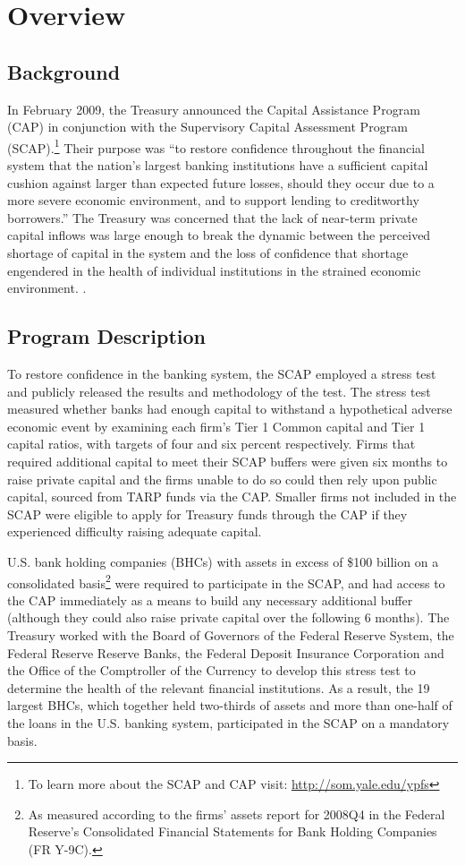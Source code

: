 \documentclass[justified, nobib]{tufte-handout2}
\begin{document}
\section{Overview}

\subsection{Background}

In February 2009, the Treasury announced the Capital Assistance Program
(CAP) in conjunction with the Supervisory Capital Assessment Program
(SCAP).\footnote{To learn more about the SCAP and CAP visit: \url{http://som.yale.edu/ypfs}} Their purpose was ``to restore confidence throughout the
financial system that the nation's largest banking institutions have a
sufficient capital cushion against larger than expected future losses,
should they occur due to a more severe economic environment, and to
support lending to creditworthy borrowers.'' The Treasury was concerned that the lack of near-term private capital inflows was large enough to
break the dynamic between the perceived shortage of capital in the
system and the loss of confidence that shortage engendered in the health
of individual institutions in the strained economic environment.
\citep{Term}.

\subsection{Program Description}

To restore confidence in the banking system, the SCAP employed a stress test and publicly
released the results and methodology of the test. The stress test measured whether banks had enough capital to withstand a hypothetical adverse economic event by examining each firm's Tier 1 Common capital and Tier 1 capital ratios, with targets of four and six percent respectively. Firms that required
additional capital to meet their SCAP buffers were given six months to
raise private capital and the firms unable to do so could then rely upon
public capital, sourced from TARP funds via the CAP. Smaller firms not
included in the SCAP were eligible to apply for Treasury funds through
the CAP if they experienced difficulty raising adequate capital.

U.S. bank holding companies (BHCs) with assets in excess of \$100
billion on a consolidated basis\footnote{As measured according to the
  firms' assets report for 2008Q4 in the Federal Reserve's Consolidated
  Financial Statements for Bank Holding Companies (FR Y-9C).} were
required to participate in the
SCAP, and had access to the CAP immediately as a means to build any
necessary additional buffer (although they could also raise private capital
over the following 6 months). The Treasury worked with the Board of Governors of the Federal Reserve System, the Federal Reserve Reserve Banks, the Federal Deposit Insurance Corporation and the Office of the Comptroller of the Currency to develop this stress test to determine the health of the
relevant financial institutions. As a result, the 19 largest BHCs, which
together held two-thirds of assets and more than one-half of the loans
in the U.S. banking system, participated in the SCAP on a mandatory
basis.\citep{OFS}
\end{document}
